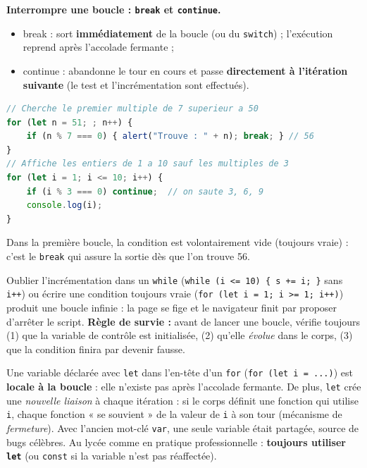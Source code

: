 \documentclass[11pt]{article}
\newcommand{\cle}[1]{{\popxbold\color{popdark}#1}}
\begin{document}
\textbf{Interrompre une boucle : \texttt{break} et \texttt{continue}.}

\begin{definition}
\begin{itemize}
\item \cle{break} : sort \textbf{immédiatement} de la boucle (ou du \texttt{switch}) ; l'exécution reprend après l'accolade fermante ;
\item \cle{continue} : abandonne le tour en cours et passe \textbf{directement à l'itération suivante} (le test et l'incrémentation sont effectués).
\end{itemize}
\end{definition}

\begin{exemplebox}
\begin{lstlisting}[language=JavaScript]
// Cherche le premier multiple de 7 superieur a 50
for (let n = 51; ; n++) {
    if (n % 7 === 0) { alert("Trouve : " + n); break; } // 56
}
// Affiche les entiers de 1 a 10 sauf les multiples de 3
for (let i = 1; i <= 10; i++) {
    if (i % 3 === 0) continue;  // on saute 3, 6, 9
    console.log(i);
}
\end{lstlisting}
Dans la première boucle, la condition est volontairement vide (toujours vraie) : c'est le \texttt{break} qui assure la sortie dès que l'on trouve 56.
\end{exemplebox}

\begin{attention}
Oublier l'incrémentation dans un \texttt{while} (\texttt{while (i <= 10) \{ s += i; \}} sans \texttt{i++}) ou écrire une condition toujours vraie (\texttt{for (let i = 1; i >= 1; i++)}) produit une \cle{boucle infinie} : la page se fige et le navigateur finit par proposer d'arrêter le script. \textbf{Règle de survie :} avant de lancer une boucle, vérifie toujours (1) que la variable de contrôle est initialisée, (2) qu'elle \emph{évolue} dans le corps, (3) que la condition finira par devenir fausse.
\end{attention}

\begin{propriete}
Une variable déclarée avec \texttt{let} dans l'en-tête d'un \texttt{for} (\texttt{for (let i = ...)}) est \textbf{locale à la boucle} : elle n'existe pas après l'accolade fermante. De plus, \texttt{let} crée une \emph{nouvelle liaison} à chaque itération : si le corps définit une fonction qui utilise \texttt{i}, chaque fonction « se souvient » de la valeur de \texttt{i} à son tour (mécanisme de \emph{fermeture}). Avec l'ancien mot-clé \texttt{var}, une seule variable était partagée, source de bugs célèbres. Au lycée comme en pratique professionnelle : \textbf{toujours utiliser \texttt{let}} (ou \texttt{const} si la variable n'est pas réaffectée).
\end{propriete}
\end{document}
